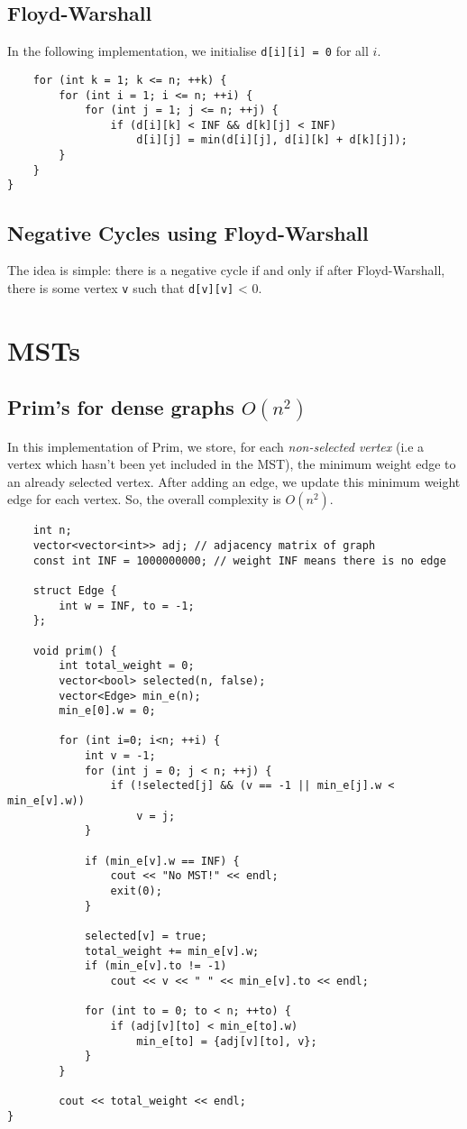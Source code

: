 \documentclass[12pt,a4paper]{amsart}
\numberwithin{equation}{section}
\theoremstyle{definition}
\begin{document}
\subsection{Floyd-Warshall} In the following implementation, we initialise \verb|d[i][i] = 0| for all $i$. 

\begin{lstlisting}
    for (int k = 1; k <= n; ++k) {
        for (int i = 1; i <= n; ++i) {
            for (int j = 1; j <= n; ++j) {
                if (d[i][k] < INF && d[k][j] < INF)
                    d[i][j] = min(d[i][j], d[i][k] + d[k][j]); 
        }
    }
}
\end{lstlisting}
 
\subsection{Negative Cycles using Floyd-Warshall} The idea is simple: there is a negative cycle if and only if after Floyd-Warshall, there is some vertex \verb|v| such that \verb|d[v][v]| < 0. 

\section{MSTs}
\subsection{Prim's for dense graphs $O(n^2)$} In this implementation of Prim, we store, for each \textit{non-selected vertex} (i.e a vertex which hasn't been yet included in the MST), the minimum weight edge to an already selected vertex. After adding an edge, we update this minimum weight edge for each vertex. So, the overall complexity is $O(n^2)$.

\begin{lstlisting}
    int n;
    vector<vector<int>> adj; // adjacency matrix of graph
    const int INF = 1000000000; // weight INF means there is no edge

    struct Edge {
        int w = INF, to = -1;
    };

    void prim() {
        int total_weight = 0;
        vector<bool> selected(n, false);
        vector<Edge> min_e(n);
        min_e[0].w = 0;

        for (int i=0; i<n; ++i) {
            int v = -1;
            for (int j = 0; j < n; ++j) {
                if (!selected[j] && (v == -1 || min_e[j].w < min_e[v].w))
                    v = j;
            }

            if (min_e[v].w == INF) {
                cout << "No MST!" << endl;
                exit(0);
            }

            selected[v] = true;
            total_weight += min_e[v].w;
            if (min_e[v].to != -1)
                cout << v << " " << min_e[v].to << endl;

            for (int to = 0; to < n; ++to) {
                if (adj[v][to] < min_e[to].w)
                    min_e[to] = {adj[v][to], v};
            }
        }

        cout << total_weight << endl;
}
\end{lstlisting}
\end{document}

